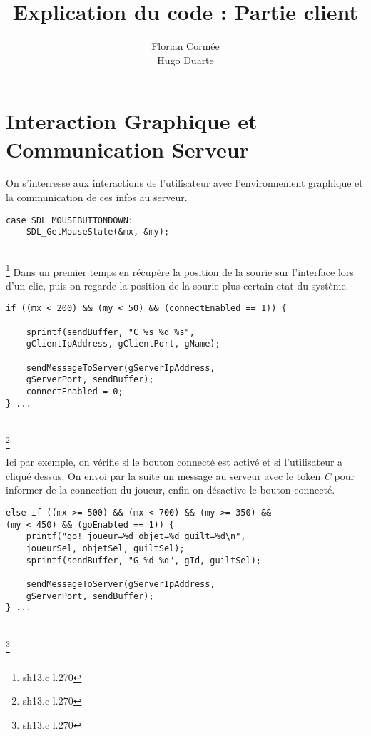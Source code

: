 \documentclass[11pt]{article}
\title{\textbf{Explication du code : Partie client}}
\author{Florian Cormée\\
		Hugo Duarte}
\date{}
\newenvironment{DDbox}[1]{
\begin{lrbox}{\BBbox}\begin{minipage}{\linewidth}}
{\end{minipage}\end{lrbox}\noindent\colorbox{Zgris}{\usebox{\BBbox}} \\
[.5cm]}
\begin{document}
\maketitle

\section{Interaction Graphique et Communication Serveur}

On s'interresse aux interactions de l'utilisateur avec l'environnement graphique et la communication de ces infos au serveur.\\

\begin{DDbox}{\linewidth}
\begin{Verbatim}
case SDL_MOUSEBUTTONDOWN:
	SDL_GetMouseState(&mx, &my);
\end{Verbatim}
\end{DDbox}
\footnote{sh13.c l.270}
Dans un premier temps en récupère la position de la sourie sur l'interface lors d'un clic, puis on regarde la position de la sourie plus certain etat du système. 
\begin{DDbox}{\linewidth}
\begin{Verbatim}
if ((mx < 200) && (my < 50) && (connectEnabled == 1)) {

	sprintf(sendBuffer, "C %s %d %s", 
	gClientIpAddress, gClientPort, gName);

	sendMessageToServer(gServerIpAddress,
	gServerPort, sendBuffer);
	connectEnabled = 0;
} ...
\end{Verbatim}
\end{DDbox}
\footnote{sh13.c l.270}

Ici par exemple, on vérifie si le bouton connecté est activé et si l'utilisateur a cliqué dessus. On envoi par la suite un message au serveur avec le token \emph{C} pour informer de la connection du joueur, enfin on désactive le bouton connecté.

\begin{DDbox}{\linewidth}
\begin{Verbatim}
else if ((mx >= 500) && (mx < 700) && (my >= 350) &&
(my < 450) && (goEnabled == 1)) {
	printf("go! joueur=%d objet=%d guilt=%d\n",
	joueurSel, objetSel, guiltSel);
	sprintf(sendBuffer, "G %d %d", gId, guiltSel);

	sendMessageToServer(gServerIpAddress, 
	gServerPort, sendBuffer);
} ...
\end{Verbatim}
\end{DDbox}
\footnote{sh13.c l.270}
\end{document}
